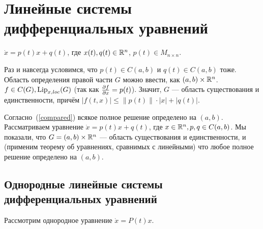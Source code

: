 \documentclass[a4paper]{report}
\begin{document}
    \section{Линейные системы дифференциальных уравнений}
    $\dot{x} = p(t)x + q(t)$, где $x(t), q(t) \in \mathbb{R}^n$, $p(t) \in M_{n \times n}$.

    Раз и навсегда условимся, что $p(t)\in C(a, b)$ и $q(t) \in C(a, b)$ тоже.
    Область определения правой части $G$ можно ввести, как $(a, b)\times \mathbb{R}^n$. $f \in C(G), \operatorname{Lip}_{x,loc}(G)$ (так как $\frac{\partial f}{\partial x} = p(t)$).
    Значит, $G$ --- область существования и единственности, причём $|f(t, x)| \le \|p(t)\| \cdot |x| + |q(t)|$.

    Согласно~(\cref{compared}) всякое полное решение определено на $(a, b)$.
    Рассматриваем уравнение $\dot{x} = p(t)x + q(t)$, где $x \in \mathbb{R}^n, p, q \in C(a, b)$.
    Мы показали, что $G = (a, b)\times \mathbb{R}^n$ --- область существования и единственности, и (применим теорему об уравнениях, сравнимых с линейными) что любое полное решение определено на $(a, b)$.


    \subsection{Однородные линейные системы дифференциальных уравнений}
    Рассмотрим однородное уравнение $\dot{x} = P(t)x$.
\end{document}
